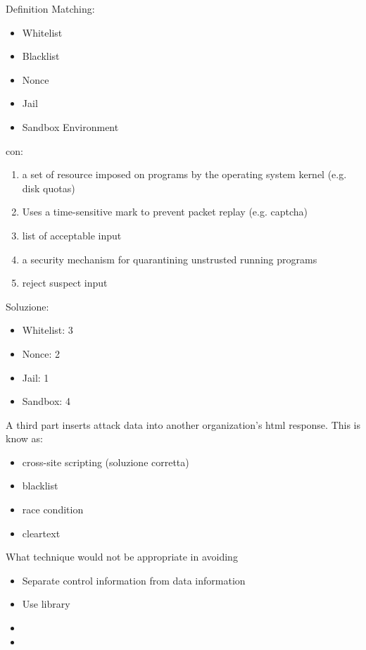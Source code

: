 Definition Matching:

\begin{itemize}
\item Whitelist
\item Blacklist
\item Nonce
\item Jail
\item Sandbox Environment
\end{itemize}

con:

\begin{enumerate}
\item a set of resource imposed on programs by the operating system kernel (e.g. 
disk quotas) 
\item Uses a time-sensitive mark to prevent packet replay (e.g. captcha)
\item list of acceptable input
\item a security mechanism for quarantining unstrusted running programs
\item reject suspect input
\end{enumerate}

Soluzione:
\begin{itemize}
\item Whitelist: 3 
\item Nonce: 2
\item Jail: 1
\item Sandbox: 4

\end{itemize}



A third part inserts attack data into another organization's html response. This 
is know as:
\begin{itemize}
\item cross-site scripting (soluzione corretta)
\item blacklist
\item race condition
\item cleartext
\end{itemize}





What technique would not be appropriate in avoiding %

\begin{itemize}
\item Separate control information from data information
\item Use library 
\item
\item
\end{itemize}

